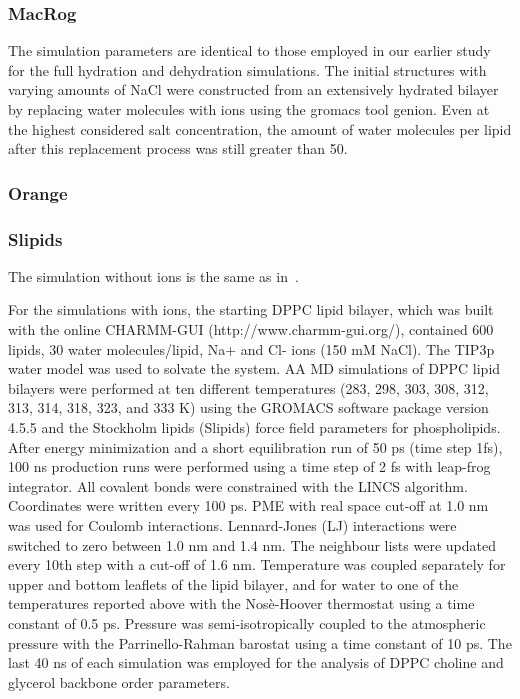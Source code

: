 \documentclass[pre,aps,floatfix,authordate1-4,twocolumn]{revtex4-1}
\begin{document}
\subsubsection{MacRog}
The simulation parameters are identical to those employed in our earlier study~\cite{botan15} for the full 
hydration and dehydration simulations. The initial structures with varying amounts of NaCl were constructed from an 
extensively hydrated bilayer by replacing water molecules with ions using the gromacs tool genion. Even at the highest 
considered salt concentration, the amount of water molecules per lipid after this replacement process was still greater than 50.

\subsubsection{Orange}

\subsubsection{Slipids}
The simulation without ions is the same as in~\cite{botan15}.

For the simulations with ions, the starting DPPC lipid bilayer, which was built with the online CHARMM-GUI
(http://www.charmm-gui.org/), contained 600 lipids, 30 water molecules/lipid, Na+ and Cl- ions (150 mM NaCl). 
The TIP3p water model was used to solvate the system. AA MD simulations of DPPC lipid bilayers were performed 
at ten different temperatures (283, 298, 303, 308, 312, 313, 314, 318, 323, and 333 K) using the GROMACS software 
package version 4.5.5 and the Stockholm lipids (Slipids) force field parameters for phospholipids. After energy 
minimization and a short equilibration run of 50 ps (time step 1fs), 100 ns production runs were performed using 
a time step of 2 fs with leap-frog integrator. All covalent bonds were constrained with the LINCS
algorithm. Coordinates were written every 100 ps. PME with real space cut-off at 1.0 nm was used for Coulomb 
interactions. Lennard-Jones (LJ) interactions were switched to zero between 1.0 nm and 1.4 nm. The neighbour 
lists were updated every 10th step with a cut-off of 1.6 nm. Temperature was coupled separately for upper and 
bottom leaflets of the lipid bilayer, and for water to one of the temperatures reported above with the Nosè-Hoover 
thermostat using a time constant of 0.5 ps. Pressure was semi-isotropically coupled to the atmospheric pressure 
with the Parrinello-Rahman barostat using a time constant of 10 ps.
The last 40 ns of each simulation was employed for the analysis of DPPC choline and glycerol backbone order parameters.
\end{document}

